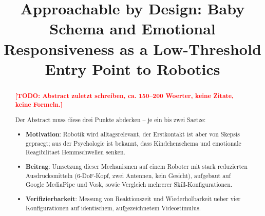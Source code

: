 \documentclass[conference]{IEEEtran}
\begin{document}

\makeatletter
{}
\makeatother
\DeclareRobustCommand{\todo}[1]{\textcolor{red}{\textbf{[TODO: #1]}}}
\DeclareRobustCommand{\needcite}[1]{\textcolor{red}{\textsuperscript{[cite: #1]}}}

\title{Approachable by Design: Baby Schema and Emotional\\ Responsiveness as a Low-Threshold Entry Point to Robotics}

\author{
}

\maketitle

\nocite{Yim2025Cuteness}
\nocite{RosenthalvonderPuetten2013}
\nocite{Rogel2026Reachy}
\nocite{Saygin2012Uncanny}
\nocite{Luetkebohle2010Flobi}
\nocite{Nitsch2014Emotions}
\nocite{Reis1988Intimacy}

\begin{abstract}
\todo{Abstract zuletzt schreiben, ca. 150--200 Woerter, keine Zitate, keine Formeln.}

\vspace{\baselineskip}
\color{structure}Der Abstract muss diese drei Punkte abdecken -- je ein bis zwei Saetze:
\begin{itemize}
    \item \textbf{Motivation}: Robotik wird alltagsrelevant, der Erstkontakt ist aber von Skepsis gepraegt; aus der Psychologie ist bekannt, dass Kindchenschema und emotionale Reagibilitaet Hemmschwellen senken.
    \item \textbf{Beitrag}: Umsetzung dieser Mechanismen auf einem Roboter mit stark reduzierten Ausdrucksmitteln (6-DoF-Kopf, zwei Antennen, kein Gesicht), aufgebaut auf Google MediaPipe und Vosk, sowie Vergleich mehrerer Skill-Konfigurationen.
    \item \textbf{Verifizierbarkeit}: Messung von Reaktionszeit und Wiederholbarkeit ueber vier Konfigurationen auf identischem, aufgezeichnetem Videostimulus.
\end{itemize}\color{black}

\end{abstract}
\end{document}
